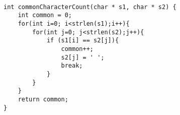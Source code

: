 \documentclass[a4paper]{article}
\begin{document}
\begin{verbatim}

int commonCharacterCount(char * s1, char * s2) {
    int common = 0;
    for(int i=0; i<strlen(s1);i++){
        for(int j=0; j<strlen(s2);j++){
            if (s1[i] == s2[j]){
                common++;
                s2[j] = ' ';
                break;
            }
        }
    }
    return common;
}

\end{verbatim}
\end{document}
